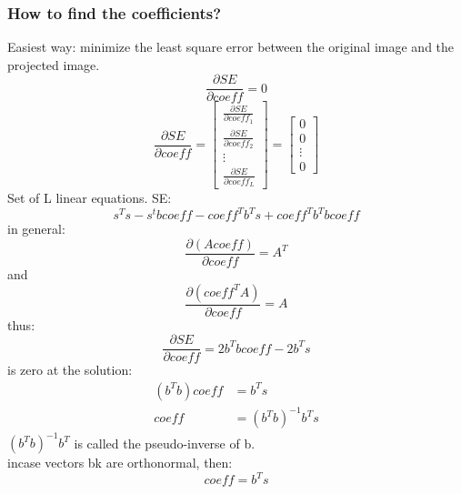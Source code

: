 \documentclass{article}
\begin{document}
\subsubsection{How to find the coefficients?}
Easiest way: minimize the least square error between the original image and the projected image. \\
\begin{equation}
    \frac{\partial SE}{\partial coeff} = 0
\end{equation}
\begin{equation}
    \frac{\partial SE}{\partial coeff} = \begin{bmatrix}
    \frac{\partial SE}{\partial coeff_1} \\
    \frac{\partial SE}{\partial coeff_2} \\
    \vdots \\
    \frac{\partial SE}{\partial coeff_L}
    \end{bmatrix} = \begin{bmatrix}
    0 \\
    0 \\
    \vdots \\
    0
    \end{bmatrix}
\end{equation}
Set of L linear equations.
SE:
\begin{equation}
    s^T s - s^t b coeff - coeff^T b^T s + coeff^T b^T b coeff
\end{equation}
in general:
\begin{equation}
    \frac{\partial (A coeff)}{\partial coeff} = A^T
\end{equation}
and 
\begin{equation}
    \frac{\partial (coeff^T A)}{\partial coeff} = A
\end{equation}
thus:
\begin{equation}
    \frac{\partial SE}{\partial coeff} = 2 b^T b coeff - 2 b^T s
\end{equation}
is zero at the solution:
\begin{equation}\begin{split}
    (b^T b) coeff &= b^T s \\
    coeff &= (b^T b)^{-1} b^T s
\end{split}\end{equation}
$(b^T b)^{-1} b^T$ is called the pseudo-inverse of b. \\
incase vectors bk are orthonormal, then:
\begin{equation}
    coeff = b^T s
\end{equation}
\end{document}
